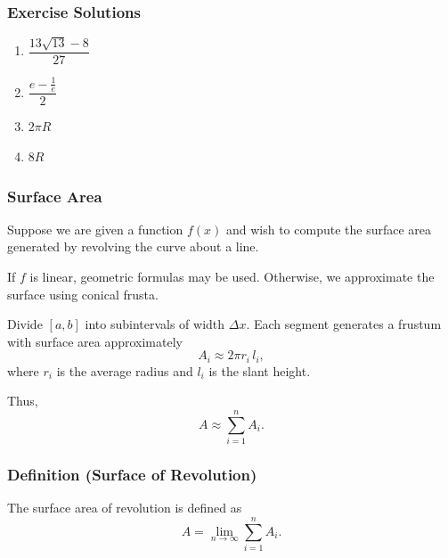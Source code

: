 \subsubsection{Exercise Solutions}
\label{sss:exer-sol-arclength}

\begin{enumerate}
\item $\dfrac{13\sqrt{13} - 8}{27}$
\item $\dfrac{e - \frac{1}{e}}{2}$
\item $2\pi R$
\item $8R$
\end{enumerate}

\subsubsection{Surface Area}
\label{sss:surf-f4a9}

Suppose we are given a function $f(x)$ and wish to compute the surface 
area generated by revolving the curve about a line.

\medskip

If $f$ is linear, geometric formulas may be used. Otherwise, we approximate 
the surface using conical frusta.

\medskip

Divide $[a,b]$ into subintervals of width $\Delta x$. Each segment generates 
a frustum with surface area approximately
\[
A_i \approx 2\pi r_i \, l_i,
\]
where $r_i$ is the average radius and $l_i$ is the slant height.

Thus,
\[
A \approx \sum_{i=1}^n A_i.
\]

\subsubsection{Definition (Surface of Revolution)}
\label{sss:defi-cf5f}

The surface area of revolution is defined as
\[
A = \lim_{n\to\infty} \sum_{i=1}^n A_i.
\]

